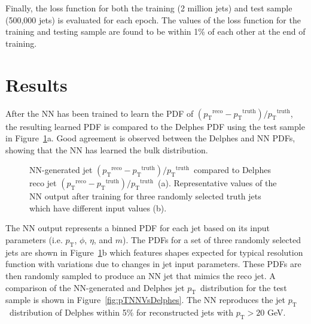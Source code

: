 \documentclass[showpacs,showkeys,preprint,prd,nofootinbib,linenumbers,12pt,superscriptaddress]{revtex4-1}
\def\pt{\ensuremath{p_{\mathrm{T}}}}
\def\ptRes{\ensuremath{(\pt^{\mathrm{reco}}-\pt^{\mathrm{truth}})/\pt^{\mathrm{truth}}}}
\begin{document}
Finally, the loss function for both the training (2 million jets) and test sample (500,000 jets) is evaluated for each epoch. The values of the loss function for the training and testing sample are found to be within 1\% of each other at the end of training. 


\FloatBarrier
\section{Results}
\label{sec:results}

After the NN has been trained to learn the PDF of \ptRes, the resulting learned PDF is compared to the Delphes PDF using the test sample in Figure~\ref{fig:PDFComp}a. Good agreement is observed between the Delphes and NN PDFs, showing that the NN has learned the bulk distribution.

\begin{figure}[htb]
  \caption{NN-generated jet \ptRes\ compared to Delphes reco jet \ptRes\ (a). Representative values of the NN output after training for three randomly selected truth jets which have different input values (b).}
  \label{fig:PDFComp}
\end{figure}

The NN output represents a binned PDF for each jet based on its input parameters (i.e. \pt, $\phi$, $\eta$, and $m$). The PDFs for a set of three randomly selected jets are shown in Figure~\ref{fig:PDFComp}b which features shapes expected for typical resolution function with variations due to changes in jet input parameters. These PDFs are then randomly sampled to produce an NN jet that mimics the reco jet. A comparison of the NN-generated and Delphes jet \pt\ distribution for the test sample is shown in Figure~\ref{fig:pTNNVsDelphes}. The NN reproduces the jet \pt\ distribution of Delphes within 5\% for reconstructed jets with $\pt>20$ GeV. 
\end{document}
